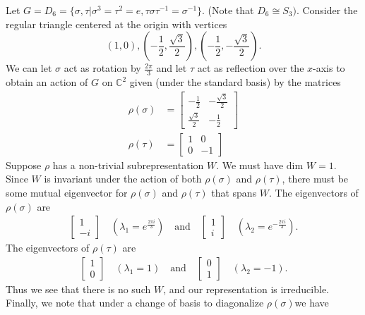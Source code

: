 \begin{example}
Let $G = D_6 = \{ \sigma, \tau | \sigma^3 = \tau^2 = e, \tau \sigma \tau^{-1} = \sigma^{-1} \}$. (Note that $D_6 \cong S_3)$.
Consider the regular triangle centered at the origin with vertices
\[(1,0), (-\frac{1}{2}, \frac{\sqrt{3}}{2}), (-\frac{1}{2}, - \frac{\sqrt{3}}{2}). \]
We can let $\sigma$ act as rotation by $\frac{2 \pi}{3}$ and let $\tau$ act as reflection over the $x$-axis to obtain an action of $G$ on $\mathbb{C}^2$ given (under the standard basis) by the matrices
\begin{align*}
\rho(\sigma) &= \begin{bmatrix}-\frac{1}{2} & -\frac{\sqrt{3}}{2} \\ \frac{\sqrt{3}}{2} & -\frac{1}{2}\end{bmatrix} \\
\rho(\tau) &= \begin{bmatrix}1 & 0 \\ 0 & -1 \end{bmatrix}
\end{align*}
Suppose $\rho$ has a non-trivial subrepresentation $W$.  We must have $\text{dim }W =1$.  Since $W$ is invariant under the action of both $\rho(\sigma)$ and $\rho(\tau)$, there must be some mutual eigenvector for $\rho(\sigma)$ and $\rho(\tau)$ that spans $W$.  The eigenvectors of $\rho(\sigma)$ are
\begin{align*}
\begin{bmatrix} 1 \\ -i \end{bmatrix} \quad (\lambda_1 = e^{\frac{2 \pi i}{3}}) \quad \text{and} \quad
\begin{bmatrix} 1 \\ i \end{bmatrix} \quad (\lambda_2 = e^{-\frac{2 \pi i}{3}}) .
\end{align*}  
The eigenvectors of $\rho(\tau)$ are 
\begin{align*}
\begin{bmatrix} 1 \\ 0 \end{bmatrix} \quad (\lambda_1 = 1) \quad \text{and} \quad
\begin{bmatrix} 0 \\ 1 \end{bmatrix} \quad (\lambda_2 = -1).
\end{align*}
Thus we see that there is no such $W$, and our representation is irreducible.
Finally, we note that under a change of basis to diagonalize $\rho(\sigma)$we have

\end{example}
